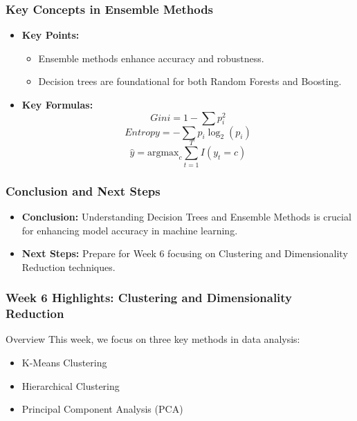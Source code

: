 \documentclass[aspectratio=169]{beamer}
\begin{document}
\begin{frame}[fragile]
    \frametitle{Key Concepts in Ensemble Methods}
    \begin{itemize}
        \item \textbf{Key Points:}
            \begin{itemize}
                \item Ensemble methods enhance accuracy and robustness.
                \item Decision trees are foundational for both Random Forests and Boosting.
            \end{itemize}
        \item \textbf{Key Formulas:}
            \begin{equation}
                Gini = 1 - \sum p_i^2
            \end{equation}
            \begin{equation}
                Entropy = - \sum p_i \log_2(p_i)
            \end{equation}
            \begin{equation}
                \hat{y} = \text{argmax}_c \sum_{t=1}^T I(y_t = c)
            \end{equation}
    \end{itemize}
\end{frame}

\begin{frame}[fragile]
    \frametitle{Conclusion and Next Steps}
    \begin{itemize}
        \item \textbf{Conclusion:} Understanding Decision Trees and Ensemble Methods is crucial for enhancing model accuracy in machine learning.
        \item \textbf{Next Steps:} Prepare for Week 6 focusing on Clustering and Dimensionality Reduction techniques.
    \end{itemize}
\end{frame}

\begin{frame}[fragile]
    \frametitle{Week 6 Highlights: Clustering and Dimensionality Reduction}
    \begin{block}{Overview}
        This week, we focus on three key methods in data analysis:
        \begin{itemize}
            \item K-Means Clustering
            \item Hierarchical Clustering
            \item Principal Component Analysis (PCA)
        \end{itemize}
    \end{block}
\end{frame}
\end{document}
